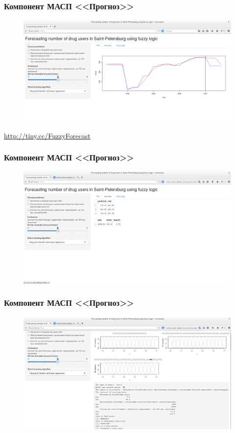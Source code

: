 \documentclass[t]{beamer}  %
\begin{document}
\begin{frame}
    \frametitle{Компонент МАСП <<Прогноз>>}
    \begin{figure}
        \centering
        \includegraphics[width=\textwidth]{screenshot1.png}
    \end{figure}
    \url{http://tiny.cc/FuzzyForecast}
\end{frame}
\begin{frame}
    \frametitle{Компонент МАСП <<Прогноз>>}
    \begin{figure}
        \centering
        \includegraphics[width=\textwidth]{screenshot2.png}
    \end{figure}
\end{frame}
\begin{frame}
    \frametitle{Компонент МАСП <<Прогноз>>}
    \begin{figure}
        \centering
        \includegraphics[width=\textwidth]{screenshot3.png}
    \end{figure}
\end{frame}
\end{document}

